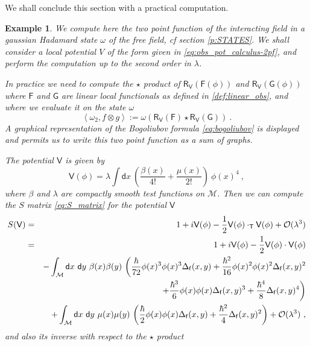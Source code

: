 \documentclass[11pt]{book}
\newcommand{\sm}[1]{\left\langle#1\right\rangle}
\newcommand{\Mcal}{\mathcal{M}}
\newcommand{\Ocal}{\mathcal{O}}
\newcommand{\Fsf}{\mathsf{F}}
\newcommand{\Gsf}{\mathsf{G}}
\newcommand{\Rsf}{\mathsf{R}}
\newcommand{\Tsf}{\mathsf{T}}
\newcommand{\Vsf}{\mathsf{V}}
\newcommand{\dsf}{\mathsf{d}}
\newcommand{\fsf}{\mathsf{f}}
\theoremstyle{break}
\newtheorem{example}{Example}[chapter]
\begin{document}
We shall conclude this section with a practical computation.


\begin{example}
We compute here the two point function of the interacting field in a gaussian Hadamard state $\omega$ of the free field, cf section \ref{p:STATES}. We shall consider a local potential $V$ of the form given in \eqref{eq:obs_pot_calculus-2pf}, and perform the computation up to the second order in $\lambda$. \par
%
%
In practice we need to compute the $\star$ product of $\Rsf_\Vsf(\Fsf(\phi))$ and $\Rsf_\Vsf(\Gsf(\phi))$ where $\Fsf$ and $\Gsf$ are linear local functionals as defined in \ref{def:linear_obs}, and where we evaluate it on the state $\omega$
%
\begin{equation*}
\sm{ \omega_2, f \otimes g } := \omega(\Rsf_\Vsf(\Fsf) \star \Rsf_\Vsf(\Gsf)) \ .
\end{equation*}
%
%
A graphical representation of the Bogoliubov formula \eqref{eq:bogoliubov} is displayed and permits us to write this two point function as a sum of graphs.\par
%
%
The potential $\Vsf$ is given by
%
\begin{equation}
\Vsf(\phi) = \lambda \int \dsf x \ \left( \frac{\beta(x)}{4!} + \frac{\mu(x)}{2!} \right) \ \phi(x)^4 \ ,
\label{eq:obs_pot_calculus-2pf}
\end{equation}
%
where $\beta$ and $\lambda$ are compactly smooth test functions on $\Mcal$. Then we can compute the $S$ matrix \eqref{eq:S_matrix} for the potential $\Vsf$
%
\begin{eqnarray*}
S(\Vsf) &=& 1 + i \Vsf(\phi) - \frac{1}{2} \Vsf(\phi) \cdot_\Tsf \Vsf(\phi) + \Ocal(\lambda^3) \\
&=&  \ 1 + i \Vsf(\phi) - \frac{1}{2} \Vsf(\phi) \cdot \Vsf(\phi) \\
&& - \int_\Mcal \dsf x \ \dsf y \ \beta(x) \beta(y) \ \bigg( 
\frac{\hbar}{72} \phi(x)^3 \phi(x)^3 \Delta_\fsf(x,y) + \frac{\hbar^2}{16} \phi(x)^2 \phi(x)^2 \Delta_\fsf(x,y)^2 \\ 
&& \hspace*{13pt} + \frac{\hbar^3}{6} \phi(x) \phi(x) \Delta_\fsf(x,y)^3 + \frac{\hbar^4}{8} \Delta_\fsf(x,y)^4 \bigg) \\
&& + \int_\Mcal \dsf x \ \dsf y \ \mu(x) \mu(y) \ \bigg( 
\frac{\hbar}{2} \phi(x) \phi(x) \Delta_\fsf(x,y) + \frac{\hbar^2}{4} \Delta_\fsf(x,y)^2 \bigg) + \Ocal(\lambda^3) \ , 
\end{eqnarray*}
%
and also its inverse with respect to the $\star$ product

\end{example}
\end{document}
